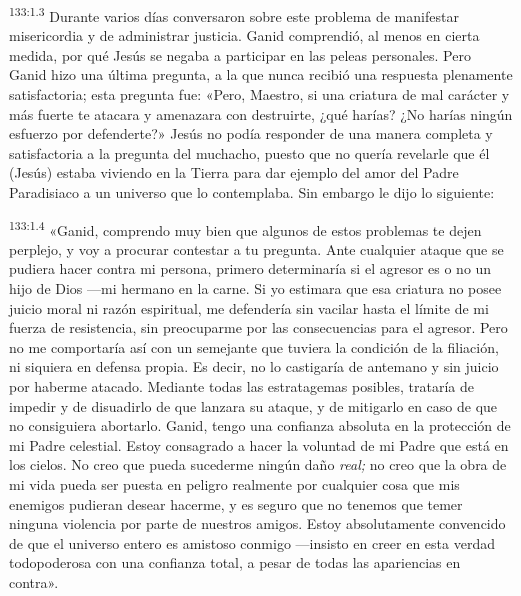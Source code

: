 \par
\textsuperscript{133:1.3} Durante varios días conversaron sobre este problema de manifestar misericordia y de administrar justicia. Ganid comprendió, al menos en cierta medida, por qué Jesús se negaba a participar en las peleas personales. Pero Ganid hizo una última pregunta, a la que nunca recibió una respuesta plenamente satisfactoria; esta pregunta fue: «Pero, Maestro, si una criatura de mal carácter y más fuerte te atacara y amenazara con destruirte, ¿qué harías? ¿No harías ningún esfuerzo por defenderte?» Jesús no podía responder de una manera completa y satisfactoria a la pregunta del muchacho, puesto que no quería revelarle que él (Jesús) estaba viviendo en la Tierra para dar ejemplo del amor del Padre Paradisiaco a un universo que lo contemplaba. Sin embargo le dijo lo siguiente:

\par
\textsuperscript{133:1.4} «Ganid, comprendo muy bien que algunos de estos problemas te dejen perplejo, y voy a procurar contestar a tu pregunta. Ante cualquier ataque que se pudiera hacer contra mi persona, primero determinaría si el agresor es o no un hijo de Dios ---mi hermano en la carne. Si yo estimara que esa criatura no posee juicio moral ni razón espiritual, me defendería sin vacilar hasta el límite de mi fuerza de resistencia, sin preocuparme por las consecuencias para el agresor. Pero no me comportaría así con un semejante que tuviera la condición de la filiación, ni siquiera en defensa propia. Es decir, no lo castigaría de antemano y sin juicio por haberme atacado. Mediante todas las estratagemas posibles, trataría de impedir y de disuadirlo de que lanzara su ataque, y de mitigarlo en caso de que no consiguiera abortarlo. Ganid, tengo una confianza absoluta en la protección de mi Padre celestial. Estoy consagrado a hacer la voluntad de mi Padre que está en los cielos. No creo que pueda sucederme ningún daño \textit{real;} no creo que la obra de mi vida pueda ser puesta en peligro realmente por cualquier cosa que mis enemigos pudieran desear hacerme, y es seguro que no tenemos que temer ninguna violencia por parte de nuestros amigos. Estoy absolutamente convencido de que el universo entero es amistoso conmigo ---insisto en creer en esta verdad todopoderosa con una confianza total, a pesar de todas las apariencias en contra».

